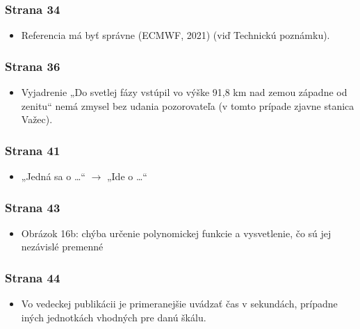 \hypertarget{strana-34}{%
\subsubsection{Strana 34}\label{strana-34}}

\begin{itemize}
\tightlist
\item
  Referencia má byť správne (ECMWF, 2021) (viď Technickú poznámku).
\end{itemize}

\hypertarget{strana-36}{%
\subsubsection{Strana 36}\label{strana-36}}

\begin{itemize}
\tightlist
\item
  Vyjadrenie „Do svetlej fázy vstúpil vo výške 91,8 km nad zemou západne
  od zenitu“ nemá zmysel bez udania pozorovateľa (v tomto prípade
  zjavne stanica Važec).
\end{itemize}

\hypertarget{strana-41}{%
\subsubsection{Strana 41}\label{strana-41}}

\begin{itemize}
\tightlist
\item
  „Jedná sa o \ldots{}“ \(\rightarrow\) „Ide o \ldots{}“
\end{itemize}

\hypertarget{strana-43}{%
\subsubsection{Strana 43}\label{strana-43}}

\begin{itemize}
\tightlist
\item
  Obrázok 16b: chýba určenie polynomickej funkcie a vysvetlenie, čo sú
  jej nezávislé premenné
\end{itemize}

\hypertarget{strana-44}{%
\subsubsection{Strana 44}\label{strana-44}}

\begin{itemize}
\tightlist
\item
  Vo vedeckej publikácii je primeranejšie uvádzať čas v sekundách,
  prípadne iných jednotkách vhodných pre danú škálu.
\end{itemize}

